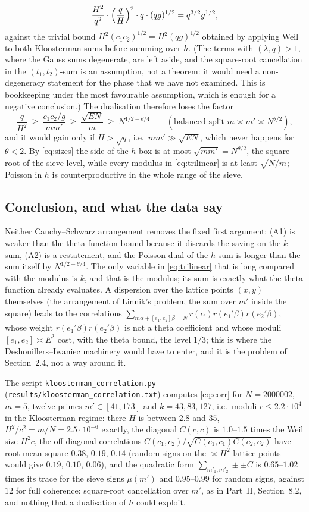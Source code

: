 \documentclass[11pt,a4paper]{article}
\theoremstyle{remark}
\theoremstyle{definition}
\begin{document}
\[
\frac{H^2}{q^2}\cdot\Bigl(\frac qH\Bigr)^2\cdot q\cdot(qg)^{1/2}=q^{3/2}g^{1/2},
\]
against the trivial bound $H^2(c_1c_2)^{1/2}=H^2(qg)^{1/2}$ obtained by applying Weil to both Kloosterman sums before summing over $h$. (The terms with $(\lambda,q)>1$, where the Gauss sums degenerate, are left aside, and the square-root cancellation in the $(t_1,t_2)$-sum is an assumption, not a theorem: it would need a non-degeneracy statement for the phase that we have not examined. This is bookkeeping under the most favourable assumption, which is enough for a negative conclusion.) The dualisation therefore loses the factor
\[
\frac q{H^2}\ \ge\ \frac{c_1c_2/g}{mm'}\ \ge\ \frac{\sqrt{EN}}{m}\ \ge\ N^{1/2-\theta/4}\qquad(\text{balanced split }m\asymp m'\asymp N^{\theta/2}),
\]
and it would gain only if $H>\sqrt q$, i.e.\ $mm'\gg\sqrt{EN}$, which never happens for $\theta<2$. By \eqref{eq:sizes} the side of the $h$-box is at most $\sqrt{mm'}=N^{\theta/2}$, the square root of the sieve level, while every modulus in \eqref{eq:trilinear} is at least $\sqrt{N/m}$; Poisson in $h$ is counterproductive in the whole range of the sieve.

\subsection{Conclusion, and what the data say}
Neither Cauchy--Schwarz arrangement removes the fixed first argument: (A1) is weaker than the theta-function bound because it discards the saving on the $k$-sum, (A2) is a restatement, and the Poisson dual of the $h$-sum is longer than the sum itself by $N^{1/2-\theta/4}$. The only variable in \eqref{eq:trilinear} that is long compared with the modulus is $k$, and that is the modulus; its sum is exactly what the theta function already evaluates. A dispersion over the lattice points $(x,y)$ themselves (the arrangement of Linnik's problem, the sum over $m'$ inside the square) leads to the correlations $\sum_{m\alpha+[e_1,e_2]\beta=N}r(\alpha)r(e_1'\beta)r(e_2'\beta)$, whose weight $r(e_1'\beta)r(e_2'\beta)$ is not a theta coefficient and whose moduli $[e_1,e_2]\asymp E^2$ cost, with the theta bound, the level $1/3$; this is where the Deshouillers--Iwaniec machinery would have to enter, and it is the problem of Section~2.4, not a way around it.

The script \texttt{kloosterman\_correlation.py} (\texttt{results/kloosterman\_correlation.txt}) computes \eqref{eq:corr} for $N=2000002$, $m=5$, twelve primes $m'\in[41,173]$ and $k=43,83,127$, i.e.\ moduli $c\le2.2\cdot10^4$ in the Kloosterman regime: there $H$ is between $2.8$ and $35$, $H^2/c^2=m/N=2.5\cdot10^{-6}$ exactly, the diagonal $C(c,c)$ is $1.0$--$1.5$ times the Weil size $H^2c$, the off-diagonal correlations $C(c_1,c_2)/\sqrt{C(c_1,c_1)C(c_2,c_2)}$ have root mean square $0.38$, $0.19$, $0.14$ (random signs on the $\asymp H^2$ lattice points would give $0.19$, $0.10$, $0.06$), and the quadratic form $\sum_{m'_1,m'_2}\pm\pm C$ is $0.65$--$1.02$ times its trace for the sieve signs $\mu(m')$ and $0.95$--$0.99$ for random signs, against $12$ for full coherence: square-root cancellation over $m'$, as in Part~II, Section~8.2, and nothing that a dualisation of $h$ could exploit.
\end{document}
